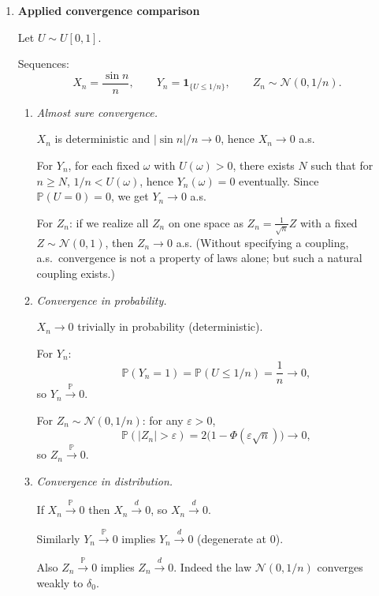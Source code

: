 \documentclass[11pt]{article}
\begin{document}
\begin{enumerate}
\begin{enumerate}
\item Interpretation:
The estimation error on the portfolio expected return scales like $1/\sqrt{n}$, and its asymptotic variance is the portfolio variance computed with $\Sigma$ (in the parameter space of $\mu$).
For large-dimensional portfolios, $w^\top\Sigma w$ can be large unless $w$ is well-regularized/diversified.
\end{enumerate}

\bigskip

\item \textbf{Applied convergence comparison}

Let $U\sim U[0,1]$.

Sequences:
\[
X_n=\frac{\sin n}{n},\qquad
Y_n=\mathbf{1}_{\{U\le 1/n\}},\qquad
Z_n\sim \mathcal{N}(0,1/n).
\]

\begin{enumerate}
\item \emph{Almost sure convergence.}

$X_n$ is deterministic and $|\sin n|/n\to 0$, hence $X_n\to 0$ a.s.

For $Y_n$, for each fixed $\omega$ with $U(\omega)>0$, there exists $N$ such that for $n\ge N$, $1/n<U(\omega)$, hence $Y_n(\omega)=0$ eventually.
Since $\mathbb{P}(U=0)=0$, we get $Y_n\to 0$ a.s.

For $Z_n$: if we realize all $Z_n$ on one space as $Z_n=\frac{1}{\sqrt{n}}Z$ with a fixed $Z\sim\mathcal{N}(0,1)$, then $Z_n\to 0$ a.s.
(Without specifying a coupling, a.s.\ convergence is not a property of laws alone; but such a natural coupling exists.)

\item \emph{Convergence in probability.}

$X_n\to 0$ trivially in probability (deterministic).

For $Y_n$:
\[
\mathbb{P}(Y_n=1)=\mathbb{P}(U\le 1/n)=\frac{1}{n}\to 0,
\]
so $Y_n\xrightarrow{\mathbb{P}}0$.

For $Z_n\sim\mathcal{N}(0,1/n)$:
for any $\varepsilon>0$,
\[
\mathbb{P}(|Z_n|>\varepsilon)=
2\Big(1-\Phi(\varepsilon\sqrt{n})\Big)\to 0,
\]
so $Z_n\xrightarrow{\mathbb{P}}0$.

\item \emph{Convergence in distribution.}

If $X_n\xrightarrow{\mathbb{P}}0$ then $X_n\xrightarrow{d}0$, so $X_n\xrightarrow{d}0$.

Similarly $Y_n\xrightarrow{\mathbb{P}}0$ implies $Y_n\xrightarrow{d}0$ (degenerate at $0$).

Also $Z_n\xrightarrow{\mathbb{P}}0$ implies $Z_n\xrightarrow{d}0$.
Indeed the law $\mathcal{N}(0,1/n)$ converges weakly to $\delta_0$.
\end{enumerate}

\end{enumerate}
\end{document}

